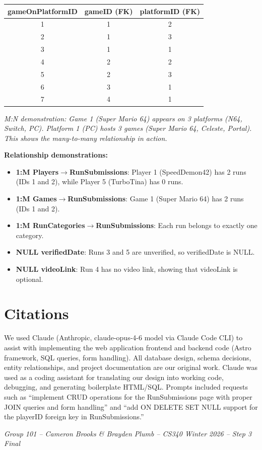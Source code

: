 \documentclass[11pt]{article}
\begin{document}
\begin{center}
\begin{tabular}{ccc}
\toprule
\textbf{gameOnPlatformID} & \textbf{gameID (FK)} & \textbf{platformID (FK)} \\
\midrule
1 & 1 & 2 \\
2 & 1 & 3 \\
3 & 1 & 1 \\
4 & 2 & 2 \\
5 & 2 & 3 \\
6 & 3 & 1 \\
7 & 4 & 1 \\
\bottomrule
\end{tabular}
\end{center}

\textit{M:N demonstration: Game 1 (Super Mario 64) appears on 3 platforms (N64, Switch, PC). Platform 1 (PC) hosts 3 games (Super Mario 64, Celeste, Portal). This shows the many-to-many relationship in action.}

\textbf{Relationship demonstrations:}
\begin{itemize}[leftmargin=2em]
    \item \textbf{1:M Players$\rightarrow$RunSubmissions}: Player 1 (SpeedDemon42) has 2 runs (IDs 1 and 2), while Player 5 (TurboTina) has 0 runs.
    \item \textbf{1:M Games$\rightarrow$RunSubmissions}: Game 1 (Super Mario 64) has 2 runs (IDs 1 and 2).
    \item \textbf{1:M RunCategories$\rightarrow$RunSubmissions}: Each run belongs to exactly one category.
    \item \textbf{NULL verifiedDate}: Runs 3 and 5 are unverified, so verifiedDate is NULL.
    \item \textbf{NULL videoLink}: Run 4 has no video link, showing that videoLink is optional.
\end{itemize}

\hrulefill

\section*{Citations}

We used Claude (Anthropic, claude-opus-4-6 model via Claude Code CLI) to assist with implementing the web application frontend and backend code (Astro framework, SQL queries, form handling). All database design, schema decisions, entity relationships, and project documentation are our original work. Claude was used as a coding assistant for translating our design into working code, debugging, and generating boilerplate HTML/SQL. Prompts included requests such as ``implement CRUD operations for the RunSubmissions page with proper JOIN queries and form handling'' and ``add ON DELETE SET NULL support for the playerID foreign key in RunSubmissions.''

\vfill
\begin{center}
\textit{Group 101 -- Cameron Brooks \& Brayden Plumb -- CS340 Winter 2026 -- Step 3 Final}
\end{center}
\end{document}

